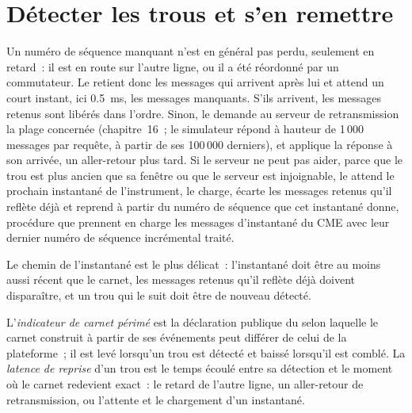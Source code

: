 \section{Détecter les trous et s'en remettre}

Un numéro de séquence manquant n'est en général pas perdu, seulement en retard~: il est en route sur l'autre ligne, ou il a été réordonné par un commutateur.
Le  retient donc les messages qui arrivent après lui et attend un court instant, ici \qty{0.5}{\milli\second}, les
messages manquants. S'ils arrivent, les messages retenus sont libérés dans l'ordre. Sinon, le  demande au serveur de retransmission
la plage concernée (chapitre~16~; le simulateur répond à hauteur de 1\,000 messages par requête, à partir de ses 100\,000 derniers), et applique la réponse
à son arrivée, un aller-retour plus tard. Si le serveur ne peut pas aider, parce que le trou est plus ancien que sa fenêtre ou que le serveur est
injoignable, le  attend le prochain instantané de l'instrument, le charge, écarte les messages retenus qu'il reflète déjà
et reprend à partir du numéro de séquence que cet instantané donne, procédure que prennent en charge les messages d'instantané du CME avec leur dernier
numéro de séquence incrémental traité.

\label{lst:ll:the-feed-handler:incremental}

Le chemin de l'instantané est le plus délicat~: l'instantané doit être au moins aussi récent que le carnet, les messages retenus qu'il reflète déjà
doivent disparaître, et un trou qui le suit doit être de nouveau détecté.

\label{lst:ll:the-feed-handler:snapshot}

\begin{definition}\label{def:ll:the-feed-handler:stale}
L'\emph{indicateur de carnet périmé} est la déclaration publique du  selon laquelle le carnet construit à partir de ses événements peut
différer de celui de la plateforme~; il est levé lorsqu'un trou est détecté et baissé lorsqu'il est comblé. La
\emph{latence de reprise} d'un trou est le temps écoulé entre sa détection et le moment où le carnet redevient exact~: le retard de l'autre ligne,
un aller-retour de retransmission, ou l'attente et le chargement d'un instantané.
\end{definition}

